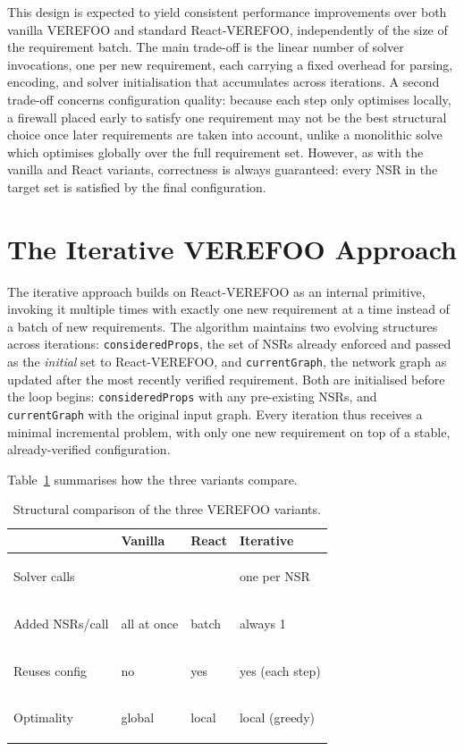 \documentclass[a4paper, 10pt, twocolumn]{article}
\begin{document}
This design is expected to yield consistent performance improvements over both vanilla VEREFOO and standard React-VEREFOO, independently of the size of the requirement batch. The main trade-off is the linear number of solver invocations, one per new requirement, each carrying a fixed overhead for parsing, encoding, and solver initialisation that accumulates across iterations. A second trade-off concerns configuration quality: because each step only optimises locally, a firewall placed early to satisfy one requirement may not be the best structural choice once later requirements are taken into account, unlike a monolithic solve which optimises globally over the full requirement set. However, as with the vanilla and React variants, correctness is always guaranteed: every NSR in the target set is satisfied by the final configuration.

\section{The Iterative VEREFOO Approach}\label{sec:iterative}

The iterative approach builds on React-VEREFOO as an internal primitive, invoking it multiple times with exactly one new requirement at a time instead of a batch of new requirements. The algorithm maintains two evolving structures across iterations: \texttt{consideredProps}, the set of NSRs already enforced and passed as the \textit{initial} set to React-VEREFOO, and \texttt{currentGraph}, the network graph as updated after the most recently verified requirement. Both are initialised before the loop begins: \texttt{consideredProps} with any pre-existing NSRs, and \texttt{currentGraph} with the original input graph. Every iteration thus receives a minimal incremental problem, with only one new requirement on top of a stable, already-verified configuration.

Table~\ref{tab:structural-comparison-summary} summarises how the three variants compare.

\begin{table}[H]
\centering
\footnotesize
\renewcommand{\arraystretch}{1.5}
\caption{Structural comparison of the three VEREFOO variants.}
\label{tab:structural-comparison-summary}
\begin{tabularx}{\linewidth}{>{\bfseries\raggedright\arraybackslash}p{1.7cm}>{\centering\arraybackslash}X>{\centering\arraybackslash}X>{\centering\arraybackslash}X}
\hline
 & \textbf{Vanilla} & \textbf{React} & \textbf{Iterative} \\
\hline
Solver calls     & 1           & 1                & one per NSR \\
Added NSRs/call  & all at once & batch            & always 1 \\
Reuses config    & no          & yes              & yes (each step) \\
Optimality       & global      & local            & local (greedy) \\
\hline
\end{tabularx}
\end{table}
\end{document}
